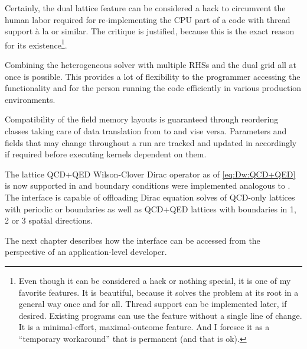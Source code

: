 Certainly, the dual lattice feature can be considered a hack to circumvent the human labor required for re-implementing the CPU part of a code with thread support à la \openmp or similar.
The critique is justified, because this is the exact reason for its existence\footnote{
Even though it can be considered a hack or nothing special, it is one of my favorite features.
It is beautiful, because it solves the problem at its root in a general way once and for all.
Thread support can be implemented later, if desired.
Existing programs can use the feature without a single line of change.
It is a minimal-effort, maximal-outcome feature.
And I foresee it as a ``temporary workaround'' that is permanent (and that is ok).
}.

Combining the heterogeneous solver with multiple RHSs and the dual grid all at once is possible.
This provides a lot of flexibility to the programmer accessing the functionality and for the person running the code efficiently in various production environments.

Compatibility of the field memory layouts is guaranteed through reordering classes taking care of data translation from \openqxd to \quda and vise versa.
Parameters and fields that may change throughout a run are tracked and updated in \quda accordingly if required before executing kernels dependent on them.

The lattice QCD+QED Wilson-Clover Dirac operator as of \cref{eq:Dw:QCD+QED} is now supported in \quda and \Cstar boundary conditions were implemented analogous to \openqxd.
The interface is capable of offloading Dirac equation solves of QCD-only lattices with periodic or \Cstar boundaries as well as QCD+QED lattices with \Cstar boundaries in \num{1}, \num{2} or \num{3} spatial directions.

The next chapter describes how the interface can be accessed from the perspective of an \openqxd application-level developer.




